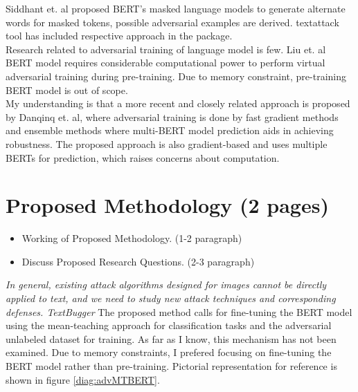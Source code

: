 \documentclass[%
	BCOR=8mm, %
	DIV=12, 
	toc=bibliography, %
	toc=listof, %
	oneside, %
	egregdoesnotlikesansseriftitles, %
	]{scrbook}
\begin{document}
Siddhant et$.$ al\cite{garg_bae_2020} proposed BERT's masked language models to generate alternate words for masked tokens, possible adversarial examples are derived. textattack tool 
has included respective approach in the package.\\

Research related to adversarial training of language model is few. Liu et$.$ al \cite{liu_adversarial_2020} BERT model requires considerable computational power to perform virtual 
adversarial training \cite{miyato_virtual_2018} during pre-training. Due to memory constraint, pre-training BERT model is out of scope.\\

My understanding is that a more recent and closely related approach is proposed by Danqinq et$.$ al\cite{zhu_at-bert_2021}, where adversarial training is done by fast gradient 
methods \cite{miyato_adversarial_2017} and ensemble methods where multi-BERT model prediction aids in achieving robustness.  The proposed approach is also gradient-based 
and uses multiple BERTs for prediction, which raises concerns about computation. \\




\chapter{Proposed Methodology (2 pages)}


\begin{itemize}
\item Working of Proposed Methodology. (1-2 paragraph)
\item Discuss Proposed Research Questions. (2-3 paragraph)
\end{itemize}

\textit{In general, existing attack algorithms designed for images cannot be directly applied to text, and we need to study new attack techniques and corresponding defenses. TextBugger}
The proposed method calls for fine-tuning the BERT model using the mean-teaching approach for classification tasks and the adversarial unlabeled dataset for training. As far as I know,
 this mechanism has not been examined. Due to memory constraints, I prefered focusing on fine-tuning the BERT model rather than pre-training. Pictorial representation for reference is 
 shown in figure \ref{diag:advMTBERT}.\\
 
\end{document}
